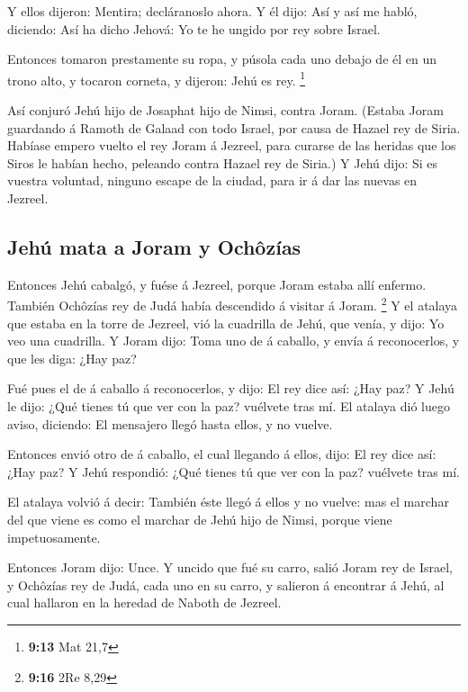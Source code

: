  Y ellos dijeron: Mentira; decláranoslo ahora. Y él dijo:
Así y así me habló, diciendo: Así ha dicho Jehová: Yo te he ungido por
rey sobre Israel.

 Entonces tomaron prestamente su ropa, y púsola cada uno
debajo de él en un trono alto, y tocaron corneta, y dijeron: Jehú es
rey. \footnote{\textbf{9:13} Mat 21,7}

 Así conjuró Jehú hijo de Josaphat hijo de Nimsi, contra
Joram. (Estaba Joram guardando á Ramoth de Galaad con todo Israel, por
causa de Hazael rey de Siria.  Habíase empero vuelto el rey
Joram á Jezreel, para curarse de las heridas que los Siros le habían
hecho, peleando contra Hazael rey de Siria.) Y Jehú dijo: Si es vuestra
voluntad, ninguno escape de la ciudad, para ir á dar las nuevas en
Jezreel.

\hypertarget{jehuxfa-mata-a-joram-y-ochuxf4zuxedas}{%
\subsection{Jehú mata a Joram y
Ochôzías}\label{jehuxfa-mata-a-joram-y-ochuxf4zuxedas}}

 Entonces Jehú cabalgó, y fuése á Jezreel, porque Joram
estaba allí enfermo. También Ochôzías rey de Judá había descendido á
visitar á Joram. \footnote{\textbf{9:16} 2Re 8,29}  Y el
atalaya que estaba en la torre de Jezreel, vió la cuadrilla de Jehú, que
venía, y dijo: Yo veo una cuadrilla. Y Joram dijo: Toma uno de á
caballo, y envía á reconocerlos, y que les diga: ¿Hay paz?

 Fué pues el de á caballo á reconocerlos, y dijo: El rey
dice así: ¿Hay paz? Y Jehú le dijo: ¿Qué tienes tú que ver con la paz?
vuélvete tras mí. El atalaya dió luego aviso, diciendo: El mensajero
llegó hasta ellos, y no vuelve.

 Entonces envió otro de á caballo, el cual llegando á
ellos, dijo: El rey dice así: ¿Hay paz? Y Jehú respondió: ¿Qué tienes tú
que ver con la paz? vuélvete tras mí.

 El atalaya volvió á decir: También éste llegó á ellos y no
vuelve: mas el marchar del que viene es como el marchar de Jehú hijo de
Nimsi, porque viene impetuosamente.

 Entonces Joram dijo: Unce. Y uncido que fué su carro,
salió Joram rey de Israel, y Ochôzías rey de Judá, cada uno en su carro,
y salieron á encontrar á Jehú, al cual hallaron en la heredad de Naboth
de Jezreel.

